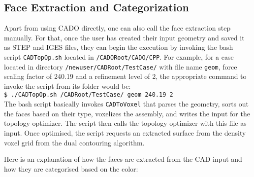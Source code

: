 \subsection{Face Extraction and Categorization}
\label{sec: FaceExtraction}

Apart from using CADO directly, one can also call the face extraction step manually. For that, once the user has created their input geometry and saved it as STEP and IGES files, they can begin the execution by invoking the bash script \lstinline|CADTopOp.sh| located in \lstinline|/CADORoot/CADO/CPP|. For example, for a case located in directory \lstinline|/newuser/CADRoot/TestCase/| with file name \lstinline|geom|, force scaling factor of 240.19 and a refinement level of 2, the appropriate command to invoke the script from its folder would be: \\

\lstinline|$ ./CADTopOp.sh /CADRoot/TestCase/ geom 240.19 2| \\

The bash script basically invokes \lstinline|CADToVoxel| that parses the geometry, sorts out the faces based on their type, voxelizes the assembly, and writes the input for the topology optimizer. The script then calls the topology optimizer with this file as input. Once optimised, the script requests an extracted surface from the density voxel grid from the dual contouring algorithm. 


Here is an explanation of how the faces are extracted from the CAD input and how they are categorised based on the color:

